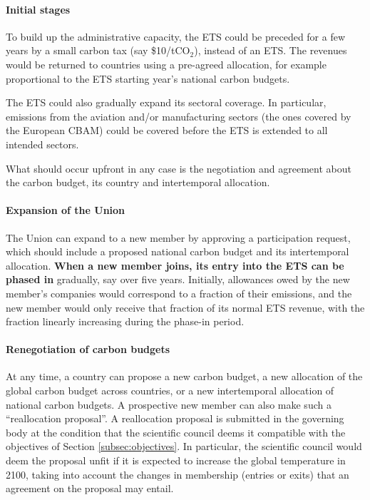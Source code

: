 \documentclass[12pt,english]{article}
\begin{document}
\paragraph{Initial stages}

To build up the administrative capacity, the ETS could be preceded for a few years by a small carbon tax (say \$10/tCO$_\text{2}$), instead of an ETS. The revenues would be returned to countries using a pre-agreed allocation, for example proportional to the ETS starting year's national carbon budgets.

The ETS could also gradually expand its sectoral coverage. In particular, emissions from the aviation and/or manufacturing sectors (the ones covered by the European CBAM) could be covered before the ETS is extended to all intended sectors.

What should occur upfront in any case is the negotiation and agreement about the carbon budget, its country and intertemporal allocation.

\paragraph{Expansion of the Union}
The Union can expand to a new member by approving a participation request, which should include a proposed national carbon budget and its intertemporal allocation. \textbf{When a new member joins, its entry into the ETS can be phased in} gradually, say over five years. Initially, allowances owed by the new member's companies would correspond to a fraction of their emissions, and the new member would only receive that fraction of its normal ETS revenue, with the fraction linearly increasing during the phase-in period. 

\paragraph{Renegotiation of carbon budgets}
At any time, a country can propose a new carbon budget, a new allocation of the global carbon budget across countries, or a new intertemporal allocation of national carbon budgets. A prospective new member can also make such a ``reallocation proposal''. A reallocation proposal is submitted in the governing body at the condition that the scientific council deems it compatible with the objectives of Section \ref{subsec:objectives}. In particular, the scientific council would deem the proposal unfit if it is expected to increase the global temperature in 2100, taking into account the changes in membership (entries or exits) that an agreement on the proposal may entail.
\end{document}

